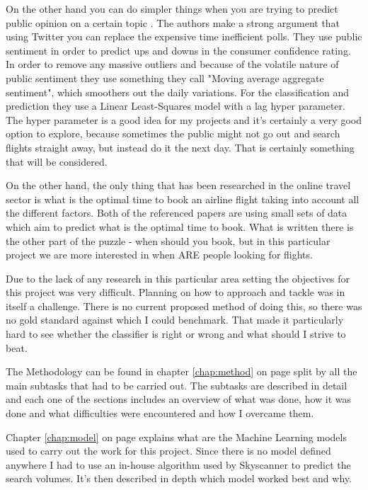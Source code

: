 \documentclass[minf,frontabs,twoside,singlespacing,parskip]{infthesis}
\begin{document}
On the other hand you can do simpler things when you are trying to predict public opinion on a certain topic \cite{twitpoll}. The authors make a strong argument that using Twitter you can replace the expensive time inefficient polls. They use public sentiment in order to predict ups and downs in the consumer confidence rating. In order to remove any massive outliers and because of the volatile nature of public sentiment they use something they call "Moving average aggregate sentiment", which smoothers out the daily variations. For the classification and prediction they use a Linear Least-Squares model with a lag hyper parameter. The hyper parameter is a good idea for my projects and it's certainly a very good option to explore, because sometimes the public might not go out and search flights straight away, but instead do it the next day. That is certainly something that will be considered. 






On the other hand, the only thing that has been researched in the online travel sector is what is the optimal time to book an airline flight taking into account all the different factors. \cite{Hamletkdd03} \cite{ijcai} 
Both of the referenced papers are using small sets of data which aim to predict what is the optimal time to book. What is written there is the other part of the puzzle - when should you book, but in this particular project we are more interested in when ARE people looking for flights.


Due to the lack of any research in this particular area setting the objectives for this project was very difficult. Planning on how to approach and tackle was in itself a challenge. There is no current proposed method of doing this, so there was no gold standard against which I could benchmark. That made it particularly hard to see whether the classifier is right or wrong and what should I strive to beat.


The Methodology can be found in chapter \ref{chap:method} on page \pageref{chap:method} split by all the main subtasks that had to be carried out. The subtasks are described in detail and each one of the sections includes an overview of what was done, how it was done and what difficulties were encountered and how I overcame them. 


Chapter \ref{chap:model} on page \pageref{chap:model} explains what are the Machine Learning models used to carry out the work for this project. Since there is no model defined anywhere I had to use an in-house algorithm used by Skyscanner to predict the search volumes. It's then described in depth which model worked best and why. 
\end{document}
